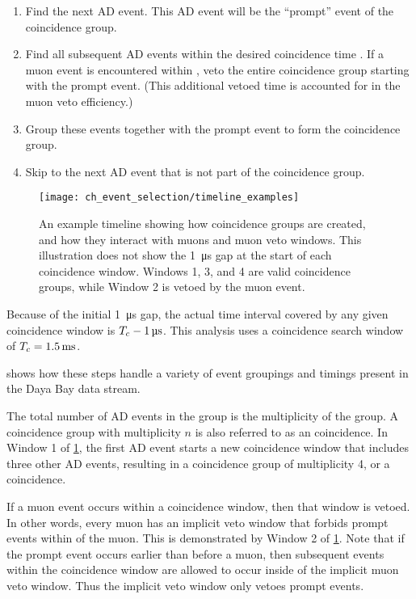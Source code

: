 \begin{enumerate}
    \item Find the next AD event.
        This AD event will be the ``prompt'' event of the coincidence group.
    \item Find all subsequent AD events within the desired coincidence time \tc.
        If a muon event is encountered within \tc,
        veto the entire coincidence group starting with the prompt event.
        (This additional vetoed time is accounted for in the muon veto efficiency.)
    \item Group these events together with the prompt event
        to form the coincidence group.
    \item Skip to the next AD event that is not part of the coincidence group.
\end{enumerate}

\begin{figure}
    \texttt{[image: ch\_event\_selection/timeline\_examples]}
    \caption{
        An example timeline showing how coincidence groups are created,
        and how they interact with muons and muon veto windows.
        This illustration does not show the \SI{1}{\micro\second} gap
        at the start of each coincidence window.
        Windows 1, 3, and 4 are valid coincidence groups,
        while Window 2 is vetoed by the muon event.
    }
    \label{fig:timeline_examples}
\end{figure}

Because of the initial \SI{1}{\micro\second} gap,
the actual time interval covered by any given coincidence window is
$T_c - \SI{1}{\micro\second}$.
This analysis uses a coincidence search window of $T_c = \SI{1.5}{\milli\second}$.

 shows how these steps handle
a variety of event groupings and timings
present in the Daya Bay data stream.

The total number of AD events in the group
is the multiplicity of the group.
A coincidence group with multiplicity $n$ is also referred to
as an  coincidence.
In Window 1 of \cref{fig:timeline_examples},
the first AD event starts a new coincidence window
that includes three other AD events,
resulting in a coincidence group of multiplicity 4, or a  coincidence.

If a muon event occurs within a coincidence window,
then that window is vetoed.
In other words, every muon has an implicit veto window
that forbids prompt events within \tc{} of the muon.
This is demonstrated by Window 2 of \cref{fig:timeline_examples}.
Note that if the prompt event occurs earlier than \tc{} before a muon,
then subsequent events within the coincidence window
are allowed to occur inside of the implicit muon veto window.
Thus the implicit veto window only vetoes prompt events.

